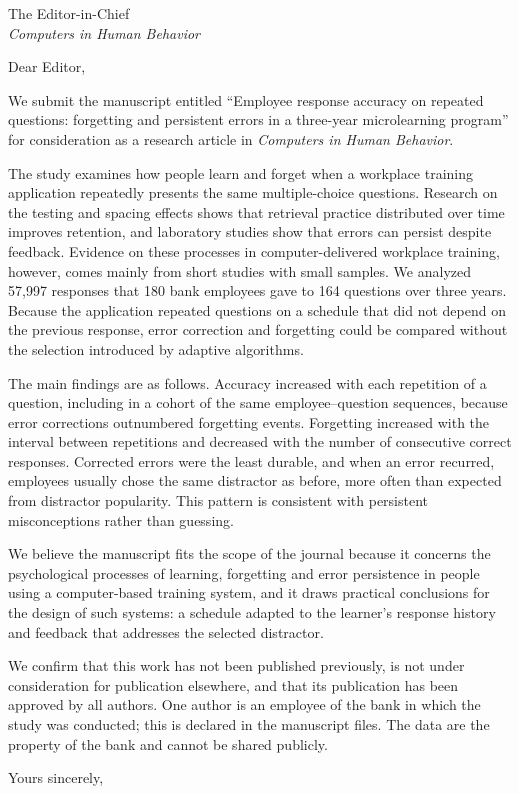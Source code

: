 \documentclass[11pt]{letter}
\begin{document}
\begin{letter}{The Editor-in-Chief\\ \textit{Computers in Human Behavior}}

\opening{Dear Editor,}

We submit the manuscript entitled ``Employee response accuracy on repeated questions: forgetting and
persistent errors in a three-year microlearning program'' for consideration as a research article in
\textit{Computers in Human Behavior}.

The study examines how people learn and forget when a workplace training application repeatedly
presents the same multiple-choice questions. Research on the testing and spacing effects shows that
retrieval practice distributed over time improves retention, and laboratory studies show that errors
can persist despite feedback. Evidence on these processes in computer-delivered workplace training,
however, comes mainly from short studies with small samples. We analyzed 57,997 responses that
180 bank employees gave to 164 questions over three years. Because the application repeated questions
on a schedule that did not depend on the previous response, error correction and forgetting could be
compared without the selection introduced by adaptive algorithms.

The main findings are as follows. Accuracy increased with each repetition of a question, including in
a cohort of the same employee--question sequences, because error corrections outnumbered forgetting
events. Forgetting increased with the interval between repetitions and decreased with the number of
consecutive correct responses. Corrected errors were the least durable, and when an error recurred,
employees usually chose the same distractor as before, more often than expected from distractor
popularity. This pattern is consistent with persistent misconceptions rather than guessing.

We believe the manuscript fits the scope of the journal because it concerns the psychological
processes of learning, forgetting and error persistence in people using a computer-based training
system, and it draws practical conclusions for the design of such systems: a schedule adapted to the
learner's response history and feedback that addresses the selected distractor.

We confirm that this work has not been published previously, is not under consideration for
publication elsewhere, and that its publication has been approved by all authors. One author is an
employee of the bank in which the study was conducted; this is declared in the manuscript files. The
data are the property of the bank and cannot be shared publicly.

\closing{Yours sincerely,}

\end{letter}
\end{document}
